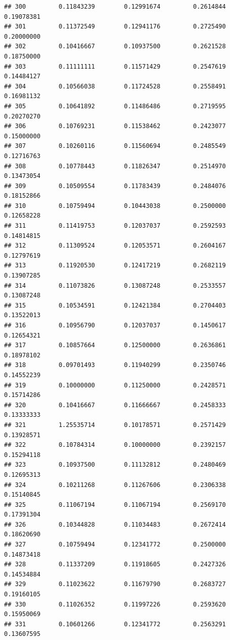 \documentclass[]{article}
\begin{document}
\begin{verbatim}
## 300         0.11843239        0.12991674         0.2614844          0.19078381
## 301         0.11372549        0.12941176         0.2725490          0.20000000
## 302         0.10416667        0.10937500         0.2621528          0.18750000
## 303         0.11111111        0.11571429         0.2547619          0.14484127
## 304         0.10566038        0.11724528         0.2558491          0.16981132
## 305         0.10641892        0.11486486         0.2719595          0.20270270
## 306         0.10769231        0.11538462         0.2423077          0.15000000
## 307         0.10260116        0.11560694         0.2485549          0.12716763
## 308         0.10778443        0.11826347         0.2514970          0.13473054
## 309         0.10509554        0.11783439         0.2484076          0.18152866
## 310         0.10759494        0.10443038         0.2500000          0.12658228
## 311         0.11419753        0.12037037         0.2592593          0.14814815
## 312         0.11309524        0.12053571         0.2604167          0.12797619
## 313         0.11920530        0.12417219         0.2682119          0.13907285
## 314         0.11073826        0.13087248         0.2533557          0.13087248
## 315         0.10534591        0.12421384         0.2704403          0.13522013
## 316         0.10956790        0.12037037         0.1450617          0.12654321
## 317         0.10857664        0.12500000         0.2636861          0.18978102
## 318         0.09701493        0.11940299         0.2350746          0.14552239
## 319         0.10000000        0.11250000         0.2428571          0.15714286
## 320         0.10416667        0.11666667         0.2458333          0.13333333
## 321         1.25535714        0.10178571         0.2571429          0.13928571
## 322         0.10784314        0.10000000         0.2392157          0.15294118
## 323         0.10937500        0.11132812         0.2480469          0.12695313
## 324         0.10211268        0.11267606         0.2306338          0.15140845
## 325         0.11067194        0.11067194         0.2569170          0.17391304
## 326         0.10344828        0.11034483         0.2672414          0.18620690
## 327         0.10759494        0.12341772         0.2500000          0.14873418
## 328         0.11337209        0.11918605         0.2427326          0.14534884
## 329         0.11023622        0.11679790         0.2683727          0.19160105
## 330         0.11026352        0.11997226         0.2593620          0.15950069
## 331         0.10601266        0.12341772         0.2563291          0.13607595

\end{verbatim}
\end{document}
